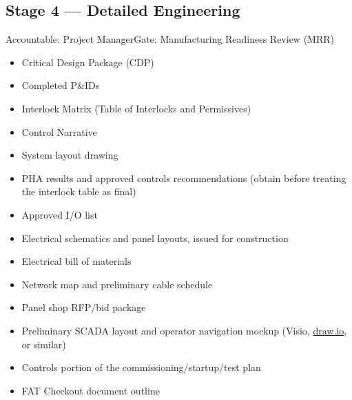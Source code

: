 \subsection{Stage 4 --- Detailed Engineering}\label{sec:stage4}
\begin{stagecard}{Accountable: Project Manager}{Gate: Manufacturing Readiness Review (MRR)}
\tcbline
\begin{minipage}[t]{0.485\linewidth}
\begin{itemize}[leftmargin=*,itemsep=1pt,topsep=2pt]
  \item Critical Design Package (CDP)
  \item Completed P\&IDs
  \item Interlock Matrix (Table of Interlocks and Permissives)
  \item Control Narrative
  \item System layout drawing
  \item PHA results and approved controls recommendations (obtain before treating the interlock table as final)
\end{itemize}
\end{minipage}\hfill
\begin{minipage}[t]{0.485\linewidth}
\begin{itemize}[leftmargin=*,itemsep=1pt,topsep=2pt]
  \item Approved I/O list
  \item Electrical schematics and panel layouts, issued for construction
  \item Electrical bill of materials
  \item Network map and preliminary cable schedule
  \item Panel shop RFP/bid package
  \item Preliminary SCADA layout and operator navigation mockup (Visio, \href{https://www.drawio.com/}{draw.io}, or similar)
  \item Controls portion of the commissioning/startup/test plan
  \item FAT Checkout document outline

\end{itemize}
\end{minipage}
\end{stagecard}
